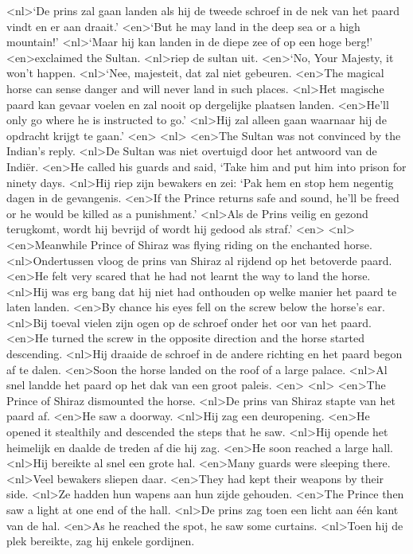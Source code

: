 <nl>`De prins zal gaan landen als hij   de tweede schroef in de nek van het paard vindt en er aan draait.'
<en>`But he may land in the deep sea or a high mountain!'
<nl>`Maar hij kan landen in de diepe zee of op een hoge berg!'
<en>exclaimed the Sultan.
<nl>riep de sultan uit.
<en>`No, Your Majesty, it won't happen.
<nl>`Nee, majesteit, dat zal niet gebeuren.
<en>The magical horse can sense danger and will never land in such places.
<nl>Het magische paard kan gevaar voelen en zal nooit op dergelijke plaatsen landen.
<en>He'll only go where he is instructed to go.'
<nl>Hij zal alleen gaan waarnaar hij de opdracht krijgt te gaan.'
<en>
<nl>
<en>The Sultan was not convinced by the Indian's reply.
<nl>De Sultan was niet overtuigd door het antwoord van de Indi\"er.
<en>He called his guards and said, `Take him and put him into prison for ninety days.
<nl>Hij riep zijn bewakers en zei: `Pak hem en stop hem  negentig dagen in de gevangenis.
<en>If the Prince returns safe and sound, he'll be freed or he would be killed as a punishment.'
<nl>Als de Prins veilig en gezond terugkomt, wordt hij bevrijd of wordt hij  gedood als straf.'
<en>
<nl>
<en>Meanwhile Prince of Shiraz was flying riding on the enchanted horse.
<nl>Ondertussen vloog de prins van Shiraz al rijdend op het betoverde paard.
<en>He felt very scared that he had not learnt the way to land the horse.
<nl>Hij was erg bang dat hij  niet had onthouden op welke manier het paard te laten landen.
<en>By chance his eyes fell on the screw below the horse's ear.
<nl>Bij toeval vielen zijn ogen op de schroef onder het oor van het paard.
<en>He turned the screw in the opposite direction and the horse started descending.
<nl>Hij draaide de schroef in de andere richting en het paard begon af te dalen.
<en>Soon the horse landed on the roof of a large palace.
<nl>Al snel landde het paard op het dak van een groot paleis.
<en>
<nl>
<en>The Prince of Shiraz dismounted the horse.
<nl>De prins van Shiraz stapte van het paard af.
<en>He saw a doorway.
<nl>Hij zag een deuropening.
<en>He opened it stealthily and descended the steps that he saw.
<nl>Hij opende het heimelijk en daalde de treden af die hij zag.
<en>He soon reached a large hall.
<nl>Hij bereikte al snel een grote hal.
<en>Many guards were sleeping there.
<nl>Veel bewakers sliepen daar.
<en>They had kept their weapons by their side.
<nl>Ze hadden hun wapens aan hun zijde gehouden.
<en>The Prince then saw a light at one end of the hall.
<nl>De prins zag toen een licht aan \'e\'en kant van de hal.
<en>As he reached the spot, he saw some curtains.
<nl>Toen hij de plek bereikte, zag hij enkele gordijnen.
